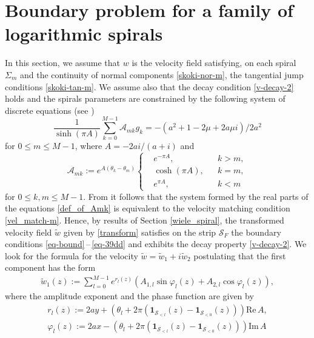 \documentclass[11pt, letterpaper, reqno]{amsart}
\numberwithin{equation}{section}
\theoremstyle{definition}
\theoremstyle{plain}
\numberwithin{equation}{section}
\def\SS{\mathcal{S}}
\begin{document}
\section{Boundary problem for a family of logarithmic spirals}
In this section, we assume that $w$ is the velocity field satisfying, on each spiral $\Sigma_{m}$ and the continuity of normal components \eqref{skoki-nor-m}, the tangential jump conditions \eqref{skoki-tan-m}. We assume also that the decay condition \eqref{v-decay-2} holds and the spirals parameters are constrained by the following system of discrete equations (see \cite[eq. (1.18)]{CKO})
\begin{equation}\label{eq-disc2}
\frac{1}{\sinh (\pi A) }\sum_{k=0}^{M-1} \mathcal{A}_{mk}g_{k} = -(a^2+1-2\mu +2a\mu i )/2a^2
\end{equation}
for $0 \le m \le M-1$, where $A = -2ai/(a+i)$ and 
\begin{equation}\label{def_of_Amk} 
\mathcal{A}_{mk}:= e^{A(\theta_{k}-\theta_{m})}
\left\{\begin{aligned}
& e^{-\pi A}, &&  k>m ,\\
& \cosh(\pi A), && k=m , \\
& e^{\pi A},  && k<m
\end{aligned}\right.
\end{equation}
for $0 \le k,m\le M-1$. From \cite[Theorem 1.3]{CKO} it follows that the system formed by the real parts of the equations \eqref{def_of_Amk} is equivalent to the velocity matching condition \eqref{vel_match-m}. Hence, by results of Section \ref{wiele_spiral}, the transformed velocity field $\tilde w$ given by \eqref{transform} satisfies on the strip $\SS_{F}$ the boundary conditions \eqref{eq-bound}\,--\,\eqref{eq-39dd} and exhibits the decay property \eqref{v-decay-2}. We look for the formula for the velocity $\tilde w = \tilde{w}_{1} + i\tilde{w}_{2} $ postulating that the first component has the form  
\begin{align}\label{w1}
\tilde w_{1}(z) := \sum_{l=0}^{M-1} e^{r_{l}(z)}(A_{1,l}\sin\varphi_{l}(z) + A_{2,l}\cos\varphi_{l}(z)),
\end{align}
where the amplitude exponent and the phase function are given by
\begin{gather*}
r_{l}(z) := 2ay + \left(\theta_{l} + 2\pi\left(\mathbf{1}_{\SS_{<l}}(z) - \mathbf{1}_{\SS_{<0}}(z)\right)\right)\mathrm{Re}\,A, \\
\varphi_{l}(z) := 2ax- \left(\theta_{l} + 2\pi\left(\mathbf{1}_{\SS_{<l}}(z) - \mathbf{1}_{\SS_{<0}}(z)\right)\right)\mathrm{Im}\,A
\end{gather*}
\end{document}
